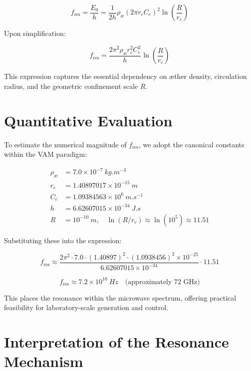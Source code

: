 \documentclass[a4paper, aps,preprint,superscriptaddress, 12pt]{revtex4}
\begin{document}
\begin{equation}
f_\text{res} = \frac{E_0}{h} = \frac{1}{2h} \rho_\text{\ae} (2\pi r_c C_e)^2 \ln\left(\frac{R}{r_c}\right)
\end{equation}

Upon simplification:

\begin{equation}
f_\text{res} = \frac{2\pi^2 \rho_\text{\ae} r_c^2 C_e^2}{h} \ln\left(\frac{R}{r_c}\right)
\end{equation}

This expression captures the essential dependency on \ae{}ther density, circulation radius, and the geometric confinement scale $R$.

\section{Quantitative Evaluation}

To estimate the numerical magnitude of $f_\text{res}$, we adopt the canonical constants within the VAM paradigm:

\begin{align*}
    \rho_\text{\ae} &= 7.0 \times 10^{-7}\ \si{kg.m^{-3}} \\
    r_c &= 1.40897017 \times 10^{-15}\ \si{m} \\
    C_e &= 1.09384563 \times 10^6\ \si{m.s^{-1}} \\
    h &= 6.62607015 \times 10^{-34}\ \si{J.s} \\
R &= 10^{-10}\ \si{m}, \quad \ln(R/r_c) \approx \ln(10^5) \approx 11.51
\end{align*}

Substituting these into the expression:

\begin{equation}
f_\text{res} \approx \frac{2\pi^2 \cdot 7.0 \cdot (1.40897)^2 \cdot (1.0938456)^2 \times 10^{-25}}{6.62607015 \times 10^{-34}} \cdot 11.51
\end{equation}

\begin{equation}
f_\text{res} \approx 7.2 \times 10^{10}\ \si{Hz} \quad \text{(approximately 72 GHz)}
\end{equation}

This places the resonance within the microwave spectrum, offering practical feasibility for laboratory-scale generation and control.

\section{Interpretation of the Resonance Mechanism}
\end{document}
